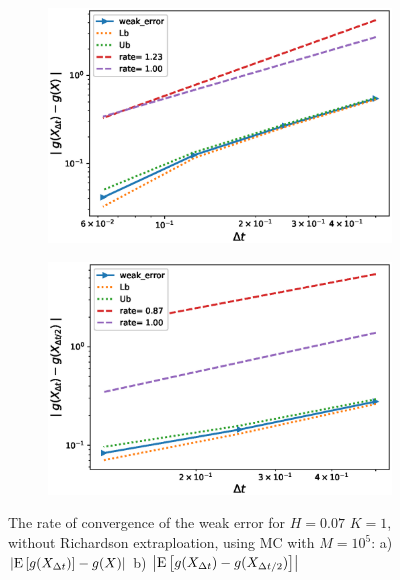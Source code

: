 \documentclass[11pt]{article}
\newcommand{\expt}[1]{\mathrm{E}\left[#1\right]}
\begin{document}
 \begin{figure}
 	\centering
 	\begin{subfigure}{.4\textwidth}
 		\centering
 		\includegraphics[width=1\linewidth]{./figures/rBergomi_weak_error_rates/with_change_measure/without_rich/H_007/weak_convergence_order_Bergomi_H_007_K_1_M_10_5_CI_relative_measure_change_spec}
 		\caption{}
 		\label{fig:sub3}
 	\end{subfigure}%
 	\begin{subfigure}{.4\textwidth}
 		\centering
 		\includegraphics[width=1\linewidth]{./figures/rBergomi_weak_error_rates/with_change_measure/without_rich/H_007/weak_convergence_order_differences_Bergomi_H_007_K_1_M_10_5_CI_relative_measure_change_spec}
 		\caption{}
 		\label{fig:sub4}
 	\end{subfigure}
 	
 	\caption{The rate of convergence of the weak error for $H=0.07$ $K=1$, without Richardson extraploation, using MC with $M=10^5$: a) $\abs{\expt{g(X_{\Delta t})}-g(X)}$  b) $\abs{\expt{g(X_{\Delta t})-g(X_{\Delta t/2})}}$ }
 	\label{fig:Weak_rate_H_007_without_rich_change_meausre}
 \end{figure}
 
\end{document}
